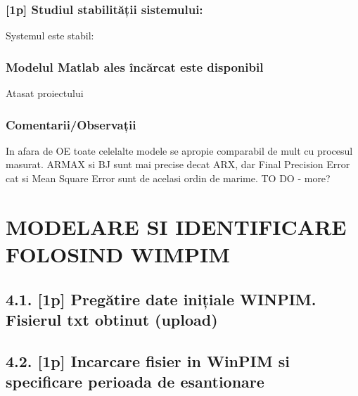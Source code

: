 \documentclass[12pt,english]{article}
\begin{document}
\subsubsection {[1p] Studiul stabilității sistemului: }
Systemul este stabil:
\begin{center}
\end{center}
\subsubsection {Modelul Matlab ales încărcat este disponibil}
Atasat proiectului
\subsubsection {Comentarii/Observații }
In afara de OE toate celelalte modele se apropie comparabil de mult cu procesul masurat. ARMAX si BJ sunt mai precise decat ARX, dar Final Precision Error cat si Mean Square Error sunt de acelasi ordin de marime.
TO DO - more?

\section {MODELARE SI IDENTIFICARE FOLOSIND WIMPIM }
\subsection {4.1. [1p] Pregătire date inițiale WINPIM. Fisierul txt obtinut (upload) }
\subsection {4.2. [1p] Incarcare fisier in WinPIM si specificare perioada de esantionare }
\end{document}
